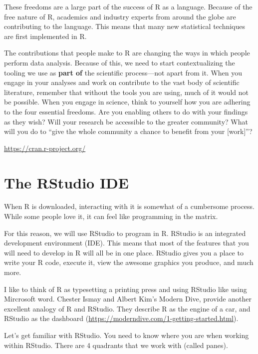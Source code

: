 \documentclass[
]{book}
\begin{document}
These freedoms are a large part of the success of R as a language. Because of the free nature of R, academics and industry experts from around the globe are contributing to the language. This means that many new statistical techniques are first implemented in R.

The contributions that people make to R are changing the ways in which people perform data analysis. Because of this, we need to start contextualizing the tooling we use as \textbf{part of} the scientific process---not apart from it. When you engage in your analyses and work on contribute to the vast body of scientific literature, remember that without the tools you are using, much of it would not be possible. When you engage in science, think to yourself how you are adhering to the four essential freedoms. Are you enabling others to do with your findings as they wish? Will your research be accessible to the greater community? What will you do to ``give the whole community a chance to benefit from your {[}work{]}''?

\url{https://cran.r-project.org/}

\hypertarget{the-rstudio-ide}{%
\section{The RStudio IDE}\label{the-rstudio-ide}}

When R is downloaded, interacting with it is somewhat of a cumbersome process. While some people love it, it can feel like programming in the matrix.

For this reason, we will use RStudio to program in R. RStudio is an integrated development environment (IDE). This means that most of the features that you will need to develop in R will all be in one place. RStudio gives you a place to write your R code, execute it, view the awesome graphics you produce, and much more.

I like to think of R as typesetting a printing press and using RStudio like using Mircrosoft word. Chester Ismay and Albert Kim's Modern Dive, provide another excellent analogy of R and RStudio. They describe R as the engine of a car, and RStudio as the dashboard (\url{https://moderndive.com/1-getting-started.html}).

Let's get familiar with RStudio. You need to know where you are when working within RStudio. There are 4 quadrants that we work with (called panes).
\end{document}

